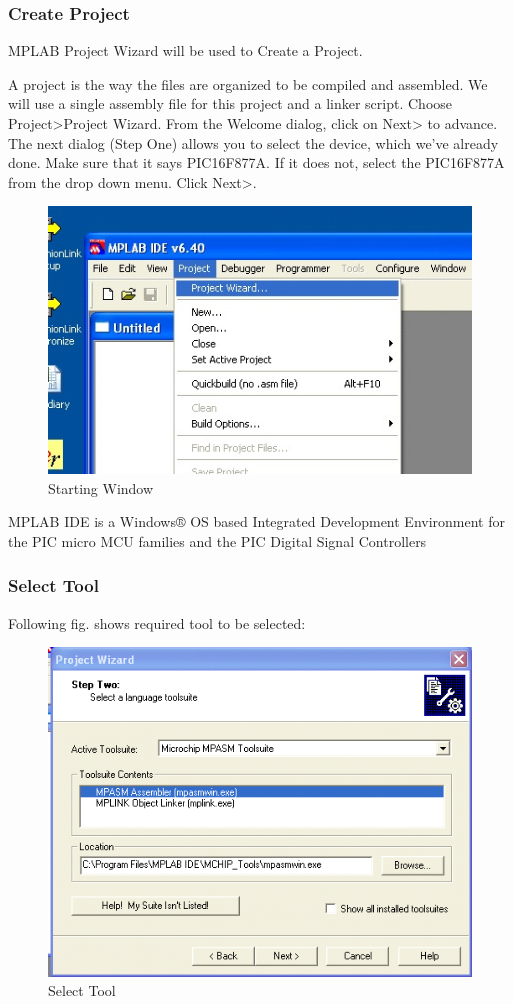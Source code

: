 \documentclass[12pt,a4paper,oneside,openright]{report}
\begin{document}
\subsubsection{Create Project}
MPLAB Project Wizard will be used to Create a Project.

A project is the way the files are organized to be compiled and assembled. We will use a single assembly file for this project and a linker script. Choose Project>Project Wizard. From the Welcome dialog, click on Next> to advance. The next dialog (Step One) allows you to select the device, which we’ve already done. Make sure that it says PIC16F877A. If it does not, select the PIC16F877A from the drop down menu. Click Next>.

\begin{figure}[!h]
 \centering
 \includegraphics[width = .80\textwidth]{Figures/15.jpg}
 \caption{Starting Window}
 \label{Starting Window}
\end{figure}

MPLAB IDE is a Windows® OS based Integrated Development Environment for the PIC micro MCU families and the PIC Digital Signal Controllers
\newpage
\subsubsection{Select Tool}
Following fig. shows required tool to be selected:
\begin{figure}[!h]
 \centering
 \includegraphics[width = \textwidth]{Figures/16.jpg}
 \caption{Select Tool}
 \label{Select Tool}
\end{figure}
\end{document}
